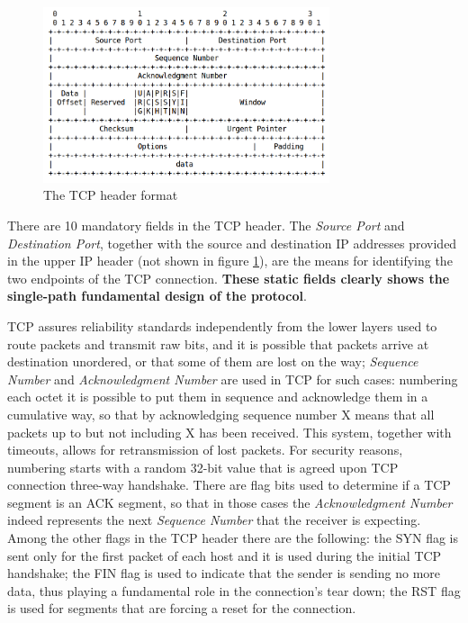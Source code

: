 \begin{figure}[!htb]
\centering
\includegraphics[width=0.75\textwidth]{images/tcp_header}
\caption{The TCP header format}
\label{fig:tcp_header}
\end{figure}

There are 10 mandatory fields in the TCP header.
The \textit{Source Port} and \textit{Destination Port}, together with the source and destination IP addresses provided in the upper IP header (not shown in figure \ref{fig:tcp_header}), are the means for identifying the two endpoints of the TCP connection. \textbf{These static fields clearly shows the single-path fundamental design of the protocol}. 


TCP assures reliability standards independently from the lower layers used to route packets and transmit raw bits, and it is possible that packets arrive at destination unordered, or that some of them are lost on the way; \textit{Sequence Number} and \textit{Acknowledgment Number} are used in TCP for such cases: numbering each octet it is possible to put them in sequence and acknowledge them in a cumulative way, so that by acknowledging sequence number X means that all packets up to but not including X has been received. This system, together with timeouts, allows for retransmission of lost packets. For security reasons, numbering starts with a random 32-bit value that is agreed upon TCP connection three-way handshake. There are flag bits used to determine if a TCP segment is an ACK segment, so that in those cases the \textit{Acknowledgment Number} indeed represents the next \textit{Sequence Number} that the receiver is expecting. Among the other flags in the TCP header there are the following:
the SYN flag is sent only for the first packet of each host and it is used during the initial TCP handshake; the FIN flag is used to indicate that the sender is sending no more data, thus playing a fundamental role in the connection's tear down; the RST flag is used for segments that are forcing a reset for the connection.


